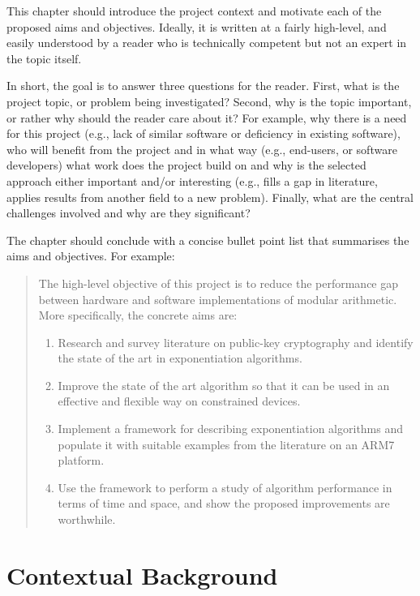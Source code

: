 \documentclass[oneside,%
                    author={Malak Hajji},
                    degree={BSc},
                    title={Designing An Accessible Computational Toolkit For Students},
                  subtitle={With Mixed Visual Abilities}]{dissertation}
\begin{document}
\noindent
This chapter should introduce the project context and motivate each of the proposed aims and objectives.  Ideally, it is written at a fairly high-level, and easily understood by a reader who is technically competent but not an expert in the topic itself.

In short, the goal is to answer three questions for the reader.  First, what is the project topic, or problem being investigated?  Second, why is the topic important, or rather why should the reader care about it?  For example, why there is a need for this project (e.g., lack of similar software or deficiency in existing software), who will benefit from the project and in what way (e.g., end-users, or software developers) what work does the project build on and why is the selected approach either important and/or interesting (e.g., fills a gap in literature, applies results from another field to a new problem).  Finally, what are the central challenges involved and why are they significant? 
 
The chapter should conclude with a concise bullet point list that summarises the aims and objectives.  For example:

\begin{quote}
\noindent
The high-level objective of this project is to reduce the performance 
gap between hardware and software implementations of modular arithmetic.  
More specifically, the concrete aims are:

\begin{enumerate}
\item Research and survey literature on public-key cryptography and
      identify the state of the art in exponentiation algorithms.
\item Improve the state of the art algorithm so that it can be used
      in an effective and flexible way on constrained devices.
\item Implement a framework for describing exponentiation algorithms
      and populate it with suitable examples from the literature on 
      an ARM7 platform.
\item Use the framework to perform a study of algorithm performance
      in terms of time and space, and show the proposed improvements
      are worthwhile.
\end{enumerate}
\end{quote}


\chapter{Contextual Background}
\label{chap:technical}
\end{document}
